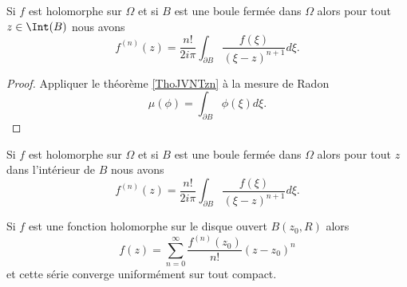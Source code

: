 \begin{lemma}
    Si \( f\) est holomorphe sur \( \Omega\) et si \( B\) est une boule fermée dans \( \Omega\) alors pour tout \( z\in \Int(B)\) nous avons
    \begin{equation}
        f^{(n)}(z)=\frac{ n! }{ 2i\pi }\int_{\partial B}\frac{ f(\xi) }{ (\xi-z)^{n+1} }d\xi.
    \end{equation}
\end{lemma}

\begin{proof}
    Appliquer le théorème \ref{ThoJVNTzn} à la mesure de Radon
    \begin{equation}
        \mu(\phi)=\int_{\partial B}\phi(\xi)d\xi.
    \end{equation}
\end{proof}

\begin{lemma}
    Si \( f\) est holomorphe sur \( \Omega\) et si \( B\) est une boule fermée dans \( \Omega\) alors pour tout \( z\) dans l'intérieur de \( B\) nous avons
    \begin{equation}
        f^{(n)}(z)=\frac{ n! }{ 2i\pi }\int_{\partial B}\frac{ f(\xi) }{ (\xi-z)^{n+1} }d\xi.
    \end{equation}
\end{lemma}

\begin{theorem}
    Si \( f\) est une fonction holomorphe sur le disque ouvert \( B(z_0,R)\) alors
    \begin{equation}
        f(z)=\sum_{n=0}^{\infty}\frac{ f^{(n)}(z_0) }{ n! }(z-z_0)^n
    \end{equation}
    et cette série converge uniformément sur tout compact.
\end{theorem}

